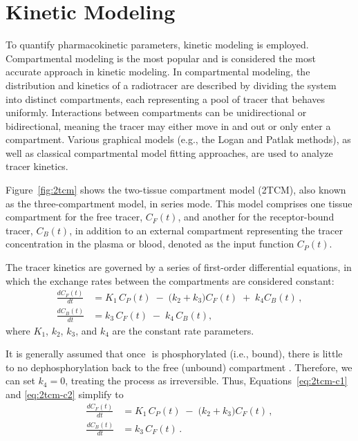 \section{Kinetic Modeling}
To quantify pharmacokinetic parameters, kinetic modeling is employed.
Compartmental modeling is the most popular and is considered the most accurate approach in kinetic modeling.
In compartmental modeling, the distribution and kinetics of a radiotracer are described by dividing the system into distinct compartments, each representing a pool of tracer that behaves uniformly.
Interactions between compartments can be unidirectional or bidirectional, meaning the tracer may either move in and out or only enter a compartment.
Various graphical models (e.g., the Logan \cite{logan1990graphical} and Patlak \cite{patlak1983graphical} methods), as well as classical compartmental model fitting approaches, are used to analyze tracer kinetics.

Figure~\ref{fig:2tcm} shows the two-tissue compartment model (2TCM), also known as the three-compartment model, in series mode.
This model comprises one tissue compartment for the free tracer, \(C_F(t)\), and another for the receptor-bound tracer, \(C_B(t)\), in addition to an external compartment representing the tracer concentration in the plasma or blood, denoted as the input function \(C_P(t)\).

The tracer kinetics are governed by a series of first-order differential equations, in which the exchange rates between the compartments are considered constant:
\begin{align}
	\frac{dC_F(t)}{dt} & = K_1 \, C_P(t) \;-\; \bigl(k_2 + k_3\bigr) C_F(t) \;+\; k_4 C_B(t) \,, \label{eq:2tcm-c1} \\[6pt]
	\frac{dC_B(t)}{dt} & = k_3 \, C_F(t) \;-\; k_4 \, C_B(t), \label{eq:2tcm-c2}
\end{align}
where \(K_1\), \(k_2\), \(k_3\), and \(k_4\) are the constant rate parameters.

It is generally assumed that once \fdg$ $ is phosphorylated (i.e., bound), there is little to no dephosphorylation back to the free (unbound) compartment \cite{schmidt1992errors}.
Therefore, we can set \(k_4 = 0\), treating the process as irreversible.
Thus, Equations~\eqref{eq:2tcm-c1} and \eqref{eq:2tcm-c2} simplify to
\begin{align}
	\frac{dC_F(t)}{dt} & = K_1 \, C_P(t) \;-\; \bigl(k_2 + k_3\bigr) C_F(t) \,, \\[6pt]
	\frac{dC_B(t)}{dt} & = k_3 \, C_F(t) \,.
\end{align}



